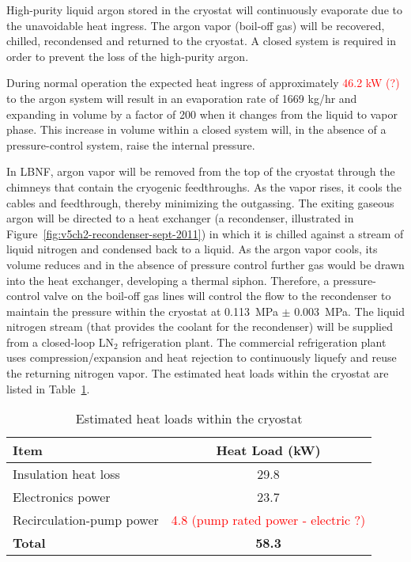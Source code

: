 High-purity liquid argon stored in the cryostat will continuously evaporate due to the unavoidable heat ingress.  The argon vapor (boil-off gas) will be recovered, chilled, recondensed and returned to the 
cryostat. A closed system is required in order to prevent the loss of the high-purity argon.

During normal operation the expected heat ingress of approximately 
\textcolor{red}{46.2 kW (?)} to the argon system will result in 
an evaporation rate of 1669 kg/hr and expanding in volume by a 
factor of 200 when it changes from the liquid to vapor phase. 
This increase in volume within a closed system will, in the 
absence of a pressure-control system, raise the internal pressure.

In LBNF, argon vapor will be removed from the top of the cryostat 
through the chimneys that contain the cryogenic feedthroughs. As 
the vapor rises, it cools the cables and feedthrough, thereby 
minimizing the outgassing. The exiting gaseous argon will be 
directed to a heat exchanger (a recondenser, illustrated in 
Figure~\ref{fig:v5ch2-recondenser-sept-2011}) in which it is 
chilled against a stream of liquid nitrogen and condensed 
back to a liquid. As the argon vapor cools, its volume 
reduces and in the absence of pressure control further 
gas would be drawn into the heat exchanger, developing 
a thermal siphon.  Therefore, a pressure-control valve on 
the boil-off gas lines will control the flow to the recondenser 
to maintain the pressure within the cryostat at 0.113~MPa $\pm$ 0.003~MPa.  
The liquid nitrogen stream (that provides the coolant for the 
recondenser) will be supplied from a closed-loop LN$_{2}$ refrigeration plant.  
The commercial refrigeration plant uses compression/expansion and heat 
rejection to continuously liquefy and reuse the returning nitrogen 
vapor. The estimated heat loads within the cryostat are listed 
in Table~\ref{table:cryo-heat-loads}.
 
\begin{table}
\centering
\caption{Estimated heat loads within the cryostat}
\label{table:cryo-heat-loads}
\begin{tabular}[htbp]{|l|c|}
\hline
{\bf Item} & {\bf Heat Load (kW)}\\
\hline\hline
Insulation heat loss & 29.8  \\
\hline
Electronics power & 23.7  \\
\hline
Recirculation-pump power & \textcolor{red}{4.8 (pump rated power - electric ?)}  \\
\hline\hline
{\bf Total} & {\bf 58.3 } \\
\hline
\end{tabular} 
\end{table}


